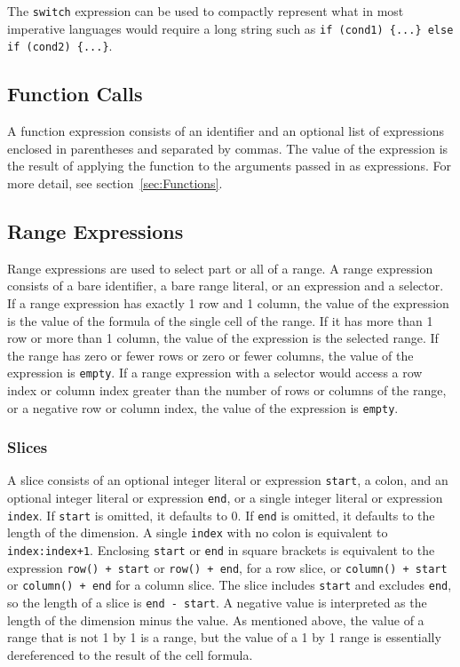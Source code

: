 The \texttt{switch} expression can be used to compactly represent what in most imperative languages would require a long string such as \texttt{if (cond1) \{...\} else if (cond2) \{...\}}.
\subsection {Function Calls}
A function expression consists of an identifier and an optional list of expressions enclosed in parentheses and separated by commas. The value of the expression is the result of applying the function to the arguments passed in as expressions. For more detail, see section~\ref{sec:Functions}.
\subsection{Range Expressions}
Range expressions are used to select part or all of a range. A range expression consists of a bare identifier, a bare range literal, or an expression and a selector. If a range expression has exactly 1 row and 1 column, the value of the expression is the value of the formula of the single cell of the range. If it has more than 1 row or more than 1 column, the value of the expression is the selected range. If the range has zero or fewer rows or zero or fewer columns, the value of the expression is \texttt{empty}. If a range expression with a selector would access a row index or column index greater than the number of rows or columns of the range, or a negative row or column index, the value of the expression is \texttt{empty}. 
\subsubsection{Slices}
A slice consists of an optional integer literal or expression \texttt{start}, a colon, and an optional integer literal or expression \texttt{end}, or a single integer literal or expression \texttt{index}. If \texttt{start} is omitted, it defaults to 0. If \texttt{end} is omitted, it defaults to the length of the dimension. A single \texttt{index} with no colon is equivalent to \texttt{index:index+1}. Enclosing \texttt{start} or \texttt{end} in square brackets is equivalent to the expression \texttt{row() + start} or \texttt{row() + end}, for a row slice, or \texttt{column() + start} or \texttt{column() + end} for a column slice. The slice includes \texttt{start} and excludes \texttt{end}, so the length of a slice is \texttt{end - start}. A negative value is interpreted as the length of the dimension minus the value.
			As mentioned above, the value of a range that is not 1 by 1 is a range, but the value of a 1 by 1 range is essentially dereferenced to the result of the cell formula.
